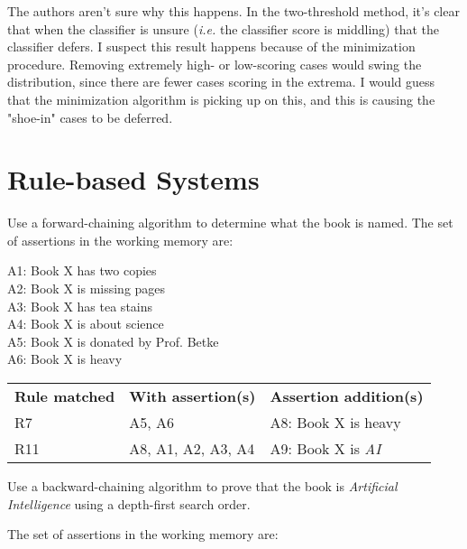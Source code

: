 \documentclass[11pt,largemargins, anonymous]{homework}
\begin{document}
\begin{arabicparts}
    \questionpart

    The authors aren't sure why this happens.
    In the two-threshold method, it's clear that when the classifier is unsure
    (\textit{i.e.} the classifier score is middling) that the classifier defers.
    I suspect this result happens because of the minimization procedure.
    Removing extremely high- or low-scoring cases would swing the distribution,
    since there are fewer cases scoring in the extrema.
    I would guess that the minimization algorithm is picking up on this,
    and this is causing the "shoe-in" cases to be deferred.

\end{arabicparts}

\clearpage
\maketitle
\clearpage
\part{Rule-based Systems}

\question

Use a forward-chaining algorithm to determine what the book is named.
The set of assertions in the working memory are:

    A1: Book X has two copies \\
    A2: Book X is missing pages \\
    A3: Book X has tea stains \\
    A4: Book X is about science \\
    A5: Book X is donated by Prof. Betke \\
    A6: Book X is heavy \\

\begin{tabular}{lll}
    \textbf{Rule matched} & \textbf{With assertion(s)} & \textbf{Assertion addition(s)} \\
    R7 & A5, A6 & A8: Book X is heavy \\
    R11 & A8, A1, A2, A3, A4 & A9: Book X is \textit{AI}
\end{tabular}

\question

Use a backward-chaining algorithm to prove that the book is \textit{Artificial Intelligence}
using a depth-first search order.

The set of assertions in the working memory are:
\end{document}
